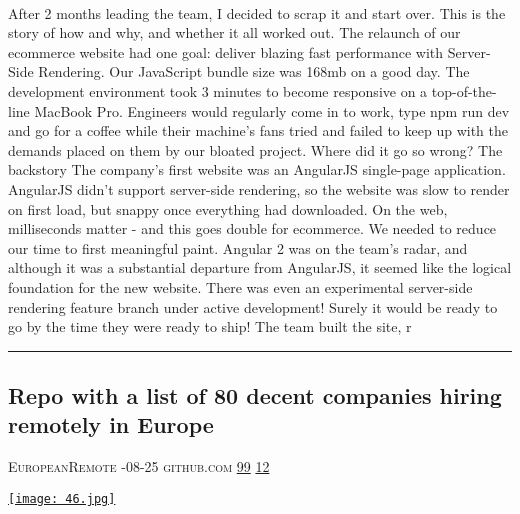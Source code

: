 \documentclass[10pt,a4paper]{article}
\begin{document}
\begin{multicols}{2}
\paragraph{}
 After 2 months leading the team, I decided to scrap it and start over. This is the story of how and why, and whether it all worked out.
The relaunch of our ecommerce website had one goal: deliver blazing fast performance with Server-Side Rendering.
Our JavaScript bundle size was 168mb on a good day. The development environment took 3 minutes to become responsive on a top-of-the-line MacBook Pro. Engineers would regularly come in to work, type
npm run dev and go for a coffee while their machine's fans tried and failed to keep up with the demands placed on them by our bloated project.
Where did it go so wrong?
The backstory
The company's first website was an AngularJS single-page application. AngularJS didn't support server-side rendering, so the website was slow to render on first load, but snappy once everything had downloaded.
On the web, milliseconds matter - and this goes double for ecommerce. We needed to reduce our time to first meaningful paint.
Angular 2 was on the team's radar, and although it was a substantial departure from AngularJS, it seemed like the logical foundation for the new website. There was even an experimental server-side rendering feature branch under active development! Surely it would be ready to go by the time they were ready to ship!
The team built the site, r
\par\noindent\textcolor{red}{\rule{\linewidth}{0.2mm}}
\vfill
\null
\noindent\begin{minipage}{\linewidth}
\subsection{Repo with a list of 80 decent companies hiring remotely in Europe}
\textsc{\footnotesize
{\scriptsize\faUser}\space 
EuropeanRemote 
{\scriptsize\faCalendar}-08-25 
{\scriptsize\faGithub}\space 
github.com 
{\scriptsize\faThumbsOUp}\space 
\href{http://news.ycombinator.com/item?id=37144925\&utm\_term=comment}{99} 
{\scriptsize\faComments}\space 
\href{http://news.ycombinator.com/item?id=37144925\&utm\_term=comment}{12} 
}
\par\medskip\noindent
\href{https://github.com/EuropeanRemote/european-remote-software-companies?utm\_source=hackernewsletter\&utm\_medium=email\&utm\_term=working}{
    \texttt{[image: 46.jpg]}
}
\end{minipage}

\end{multicols}
\end{document}
